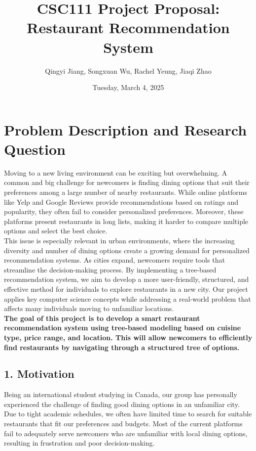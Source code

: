 \documentclass[fontsize=11pt]{article}
\title{CSC111 Project Proposal: Restaurant Recommendation System}
\author{Qingyi Jiang, Songxuan Wu, Rachel Yeung, Jiaqi Zhao}
\date{Tuesday, March 4, 2025}
\begin{document}
\maketitle

\section*{Problem Description and Research Question}
Moving to a new living environment can be exciting but overwhelming. A common and big challenge for newcomers is finding dining options that suit their preferences among a large number of nearby restaurants. While online platforms like Yelp and Google Reviews provide recommendations based on ratings and popularity, they often fail to consider personalized preferences. Moreover, these platforms present restaurants in long lists, making it harder to compare multiple options and select the best choice. \\
This issue is especially relevant in urban environments, where the increasing diversity and number of dining options create a growing demand for personalized recommendation systems. As cities expand, newcomers require tools that streamline the decision-making process. By implementing a tree-based recommendation system, we aim to develop a more user-friendly, structured, and effective method for individuals to explore restaurants in a new city. Our project applies key computer science concepts while addressing a real-world problem that affects many individuals moving to unfamiliar locations. \\
\textbf{The goal of this project is to develop a smart restaurant recommendation system using tree-based modeling based on cuisine type, price range, and location. This will allow newcomers to efficiently find restaurants by navigating through a structured tree of options.}

\subsection*{1. Motivation}
Being an international student studying in Canada, our group has personally experienced the challenge of finding good dining options in an unfamiliar city. Due to tight academic schedules, we often have limited time to search for suitable restaurants that fit our preferences and budgets. Most of the current platforms fail to adequately serve newcomers who are unfamiliar with local dining options, resulting in frustration and poor decision-making.
\end{document}
